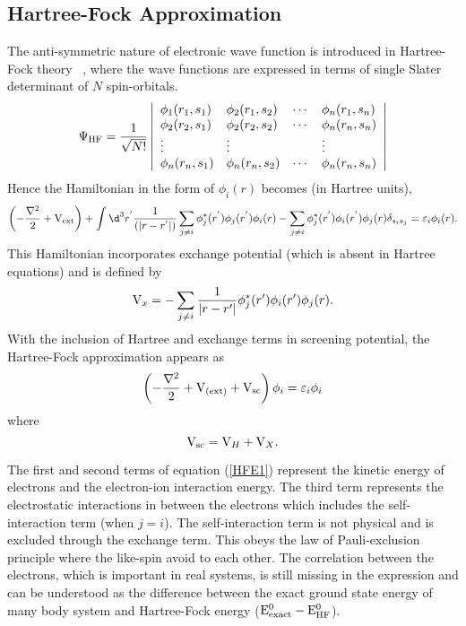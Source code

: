\subsection{Hartree-Fock Approximation}
The anti-symmetric nature of electronic wave function is introduced in Hartree-Fock theory ~\citep{Fock1930a}, where the wave functions are expressed in terms of single Slater~\citep{Slater1937} determinant of $N$ spin-orbitals.
\begin{equation}
\Psi_{\rm HF} = \frac{1}{\sqrt{N!}}
\left | \begin{array}{llcl}
\phi_{1}(r_1,s_1) & \phi_{2}(r_1,s_2) & \cdots & \phi_{n}(r_1,s_n) \\
\phi_{2}(r_2,s_1) & \phi_{2}(r_2,s_2) & \cdots & \phi_{n}(r_n,s_n) \\
           \vdots & \vdots            &        & \vdots \\
\phi_{n}(r_n,s_1) & \phi_{n}(r_n,s_2) & \cdots & \phi_{n}(r_n,s_n) \\
\end{array} \right|
\label{HFE}
\end{equation}
Hence the Hamiltonian in the form of $ \phi_i(r) $ becomes (in Hartree units),
\begin{equation}\label{HFE1}
\left(-\frac{\nabla^{2}}{2}+ {\rm V}_{\rm ext}\right)+\int \d^{3} r^{'}\frac{1}{(|r-r^{'}|)}\sum_{j \ne i} \phi_{j}^{*}(r^{'}) \phi_{j}(r^{'})
\phi_{i}(r)-\sum_{j \ne i} \phi_{j}^{*}(r^{'}) \phi_{i}(r^{'}) \phi_{j}(r)\delta_{s_{i}s_{j}} =\varepsilon_{i} \phi_{i}(r).  
\end{equation}
This Hamiltonian incorporates exchange potential (which is absent in Hartree equations) and is defined by 
\[{\rm V}_{x}= -\sum_{j \ne i}\frac{1}{|r-r'|} \phi_{j}^{*}(r') \phi_{i}(r') \phi_{j}(r). \]
With the inclusion of Hartree and exchange terms in screening potential, the Hartree-Fock approximation appears as
\[\left(-\frac{\nabla^2}{2}+ {\rm V}_{(\rm ext)} + {\rm V}_{\rm sc}\right) \phi_{i}  = \varepsilon_{i} \phi_{i}\] 
where \[{\rm V}_{\text{sc}} = {\rm V}_{H} + {\rm V}_{X}.\]

The first and second terms of equation (\ref{HFE1}) represent the kinetic energy of electrons and the electron-ion interaction energy. The third term represents the electrostatic interactions in between the electrons which includes the self-interaction term (when $j = i$). The self-interaction term is not physical and is excluded through the exchange term. This obeys the law of Pauli-exclusion principle where the like-spin avoid to each other. The correlation between the electrons, which is important in real systems, is still missing in the expression and can be understood as the difference between the exact ground state energy of many body system and Hartree-Fock energy (${\rm E}_{\text{exact}}^0 - {\rm E}_{\rm HF}^0$).
 
